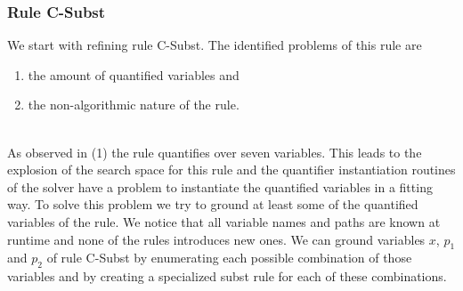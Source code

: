 \subsubsection{Rule C-Subst}
We start with refining rule C-Subst.
The identified problems of this rule are
\begin{enumerate}
    \item the amount of quantified variables and
    \item the non-algorithmic nature of the rule.
\end{enumerate}
\quad\\
As observed in (1) the rule quantifies over seven variables.
This leads to the explosion of the search space for this rule
and the quantifier instantiation routines of the solver have a
problem to instantiate the quantified variables in a fitting way.
To solve this problem we try to ground at least some
of the quantified variables of the rule.
We notice that all variable names and paths are known at runtime
and none of the rules introduces new ones.
We can ground variables $x$, $p_1$ and $p_2$ of rule C-Subst
by enumerating each possible combination of those variables
and by creating a specialized subst rule for each of these combinations.

